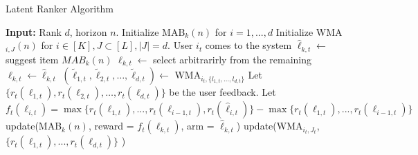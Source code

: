 

\begin{algorithm}
\caption{Latent Ranker Algorithm}
\label{alg:latent-rank}
  \begin{algorithmic}[1]
  \State \textbf{Input:} Rank $d$, horizon $n$.
  \State Initialize MAB$_k(n)$ for $i=1,...,d$
  \State Initialize WMA$_{i,J}(n)$ for $i \in [K], J \subset [L], |J| = d.$
      \State User $i_t$ comes to the system
      \State $\hat{{\ell}}_{k,t} \leftarrow$ suggest item $MAB_k(n)$
      \State ${\ell}_{k,t} \leftarrow$ select arbitrarirly from the remaining
      \Else
      \State $\ell_{k,t} \leftarrow \hat{\ell}_{k,t}$
      \EndIf
      \EndFor
      \State $(\tilde{\ell}_{1,t},\tilde{\ell}_{2,t},\dots,\tilde{\ell}_{d,t} )\leftarrow$ WMA$_{i_t,\{ l_{1,t},...,l_{d,t} \} }$ %
      \State Let  $\{ r_{t}(\ell_{1,t}), r_{t}(\ell_{2,t}),\dots,r_{t}(\ell_{d,t}) \}$ be the user feedback.
      \State Let $f_t(\ell_{i,t}) = \max \{ r_t(\ell_{1,t}),...,r_t(\ell_{i-1,t}),r_t(\hat{\ell}_{i,t}) \} - \max \{ r_t(\ell_{1,t}),...,r_t(\ell_{i-1,t}) \}$ 
      \State update(MAB$_{k}(n)$, reward = $f_t(\ell_{k,t})$, arm = $\hat{\ell}_{k,t}$)
      \State update(WMA$_{i_t,J_t}$,$\{ r_t(\ell_{1,t}),...,r_t(\ell_{d,t})\}$ )
    \EndFor
  \end{algorithmic}
\end{algorithm}

